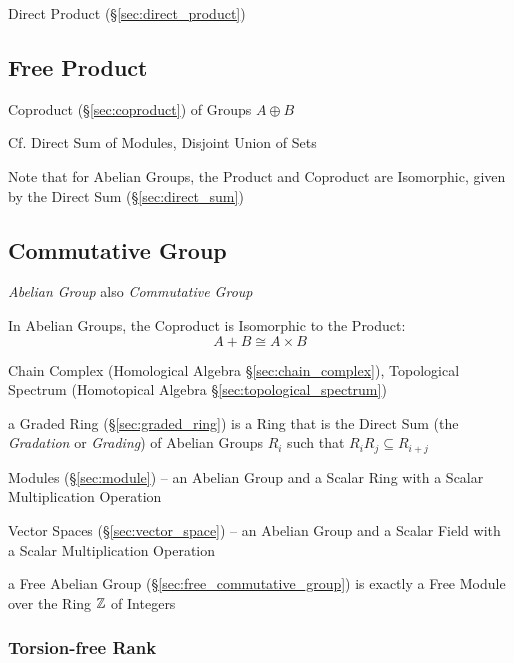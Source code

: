 Direct Product (\S\ref{sec:direct_product})



\subsection{Free Product}\label{sec:free_product}

Coproduct (\S\ref{sec:coproduct}) of Groups $A \oplus B$

\fist Cf. Direct Sum of Modules, Disjoint Union of Sets

\fist Note that for Abelian Groups, the Product and Coproduct
are Isomorphic, given by the Direct Sum (\S\ref{sec:direct_sum})



\subsection{Commutative Group}\label{sec:commutative_group}

\emph{Abelian Group} also \emph{Commutative Group}

In Abelian Groups, the Coproduct is Isomorphic to the Product:
\[
  A + B \cong A \times B
\]

\fist Chain Complex (Homological Algebra \S\ref{sec:chain_complex}), Topological
Spectrum (Homotopical Algebra \S\ref{sec:topological_spectrum})

\fist a Graded Ring (\S\ref{sec:graded_ring}) is a Ring that is the Direct Sum
(the \emph{Gradation} or \emph{Grading}) of Abelian Groups $R_i$ such that
$R_iR_j \subseteq R_{i+j}$

\fist Modules (\S\ref{sec:module}) -- an Abelian Group and a Scalar Ring with a
Scalar Multiplication Operation

\fist Vector Spaces (\S\ref{sec:vector_space}) -- an Abelian Group and a Scalar
Field with a Scalar Multiplication Operation

\fist a Free Abelian Group (\S\ref{sec:free_commutative_group}) is exactly a
Free Module over the Ring $\mathbb{Z}$ of Integers



\subsubsection{Torsion-free Rank}\label{sec:torsionfree_rank}

